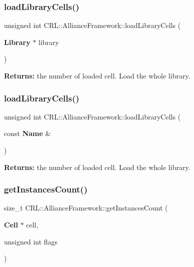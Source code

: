 \subsubsection{\texorpdfstring{load\+Library\+Cells()}{loadLibraryCells()}\hspace{0.1cm}{\footnotesize\ttfamily [1/2]}}
{\footnotesize\ttfamily unsigned int C\+R\+L\+::\+Alliance\+Framework\+::load\+Library\+Cells (\begin{DoxyParamCaption}\item[{\textbf{ Library} $\ast$}]{library }\end{DoxyParamCaption})}

{\bfseries Returns\+:} the number of loaded cell. Load the whole library. \mbox{\label{classCRL_1_1AllianceFramework_adc8acedeb9daa37b4ab2dee0717835fa}} 
\subsubsection{\texorpdfstring{load\+Library\+Cells()}{loadLibraryCells()}\hspace{0.1cm}{\footnotesize\ttfamily [2/2]}}
{\footnotesize\ttfamily unsigned int C\+R\+L\+::\+Alliance\+Framework\+::load\+Library\+Cells (\begin{DoxyParamCaption}\item[{const \textbf{ Name} \&}]{ }\end{DoxyParamCaption})}

{\bfseries Returns\+:} the number of loaded cell. Load the whole library. \mbox{\label{classCRL_1_1AllianceFramework_a95aa8c6b8ab3f995daf22a0317324933}} 
\subsubsection{\texorpdfstring{get\+Instances\+Count()}{getInstancesCount()}}
{\footnotesize\ttfamily size\+\_\+t C\+R\+L\+::\+Alliance\+Framework\+::get\+Instances\+Count (\begin{DoxyParamCaption}\item[{\textbf{ Cell} $\ast$}]{cell,  }\item[{unsigned int}]{flags }\end{DoxyParamCaption})\hspace{0.3cm}{\ttfamily [static]}}

